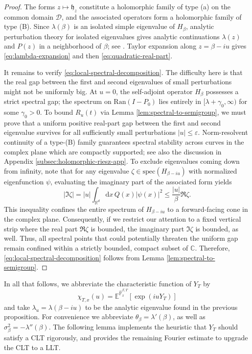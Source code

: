 \documentclass[11pt,reqno]{amsart}
\theoremstyle{definition}
\numberwithin{equation}{section}
\newcommand{\<}{\langle}
\renewcommand{\>}{\rangle}
\def\de{{\rm d}}
\def\cD{{\cal D}}
\def\de{{\mathrm {d}}}
\def\cD{{{\mathcal D}}}
\def\bbE{{\mathbb{E}}}
\def\bbPh{{\hat{\mathbb{P}}}}
\begin{document}
\begin{proof}
The forms $z\mapsto\mathfrak h_z$ constitute a holomorphic family of type
(a) on the common domain $\cD$, and the associated operators form a
holomorphic family of type (B).  Since $\lambda (\beta)$ is an isolated simple
eigenvalue of $H_\beta$, analytic perturbation theory for isolated
eigenvalues gives analytic continuations $\lambda(z)$ and $P(z)$ in a
neighborhood of $\beta$; see
\cite[Chapter~VII, Sections~1 and~4]{Kato}.  Taylor expansion along
$z=\beta-iu$ gives
\eqref{eq:lambda-expansion} and then
\eqref{eq:quadratic-real-part}.


It remains to verify \eqref{eq:local-spectral-decomposition}. The difficulty here is that the real gap between the first and second eigenvalues of small perturbations might not be uniformly big. At $u=0$, the self-adjoint operator $H_{\beta}$ possesses a strict spectral gap; the spectrum on $\text{Ran}(I-P_0)$ lies entirely in $[\lambda+\gamma_{0},\infty)$ for some $\gamma_{0}>0$. To bound $R_u(t)$ via Lemma \ref{lem:spectral-to-semigroup}, we must prove that a uniform positive real-part gap between the first and second eigenvalue survives for all sufficiently small perturbations $|u| \le \varepsilon$.
Norm-resolvent continuity of a type-(B) family guarantees spectral stability across curves in the complex plane which are compactly supported; see also the discussion in Appendix \ref{subsec:holomorphic-riesz-app}.
To  exclude eigenvalues coming down from infinity, note that for any eigenvalue $\zeta \in \text{spec}(H_{\beta-iu})$ with normalized eigenfunction $\psi$, evaluating the imaginary part of the associated form yields
\begin{equation*}
|\mathfrak{I}\zeta|=|u|\int_{\mathbb{R}^d}\de x \, Q(x)|\psi (x)|^{2}\le\frac{|u|}{\beta}\mathfrak{R}\zeta.
\end{equation*}
This inequality confines the entire spectrum of $H_{\beta-iu}$ to a forward-facing cone in the complex plane. Consequently, if we restrict our attention to a fixed vertical strip where the real part $\mathfrak{R}\zeta$ is bounded, the imaginary part $\mathfrak{I}\zeta$ is bounded, as well.
Thus, all spectral points that could potentially threaten the uniform gap remain confined within a strictly bounded, compact subset of $\mathbb{C}$. Therefore, \eqref{eq:local-spectral-decomposition} follows from Lemma \ref{lem:spectral-to-semigroup}.
\end{proof}


In all that follows, we abbreviate the characteristic function of $Y_T$ by
\[\chi_{T,x}(u) = \bbE^{\bbPh_x ^{\beta,T}}[\exp(iuY_T)]\]
and take $\lambda_u =\lambda(\beta-iu)$ to be the analytic eigenvalue found in the previous proposition. For convenience we  abbreviate $\theta_\beta = \lambda' (\beta)$, as well as $\sigma^2 _\beta = - \lambda '' (\beta)$. The following lemma implements the heuristic that $Y_T$ should satisfy a CLT rigorously, and provides the remaining Fourier estimate to upgrade the CLT to a LLT.
\end{document}
